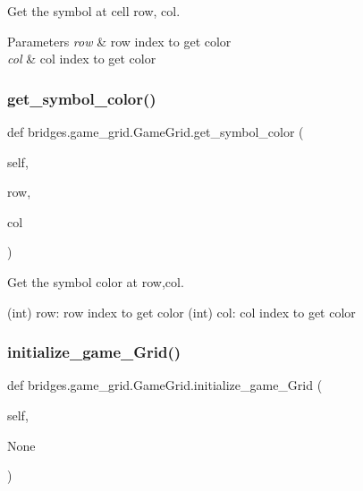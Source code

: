 Get the symbol at cell row, col. 


\begin{DoxyParams}{Parameters}
{\em row} & row index to get color \\
\hline
{\em col} & col index to get color \\
\hline
\end{DoxyParams}
\mbox{\label{classbridges_1_1game__grid_1_1_game_grid_a7324c15bc6983621ed84964dde173f7f}} 
\subsubsection{\texorpdfstring{get\+\_\+symbol\+\_\+color()}{get\_symbol\_color()}}
{\footnotesize\ttfamily def bridges.\+game\+\_\+grid.\+Game\+Grid.\+get\+\_\+symbol\+\_\+color (\begin{DoxyParamCaption}\item[{}]{self,  }\item[{}]{row,  }\item[{}]{col }\end{DoxyParamCaption})}



Get the symbol color at row,col. 

(int) row\+: row index to get color (int) col\+: col index to get color \mbox{\label{classbridges_1_1game__grid_1_1_game_grid_aefa77d94a0f5d43d029e5bb9856dd911}} 
\subsubsection{\texorpdfstring{initialize\+\_\+game\+\_\+\+Grid()}{initialize\_game\_Grid()}}
{\footnotesize\ttfamily def bridges.\+game\+\_\+grid.\+Game\+Grid.\+initialize\+\_\+game\+\_\+\+Grid (\begin{DoxyParamCaption}\item[{}]{self,  }\item[{}]{None }\end{DoxyParamCaption})}



